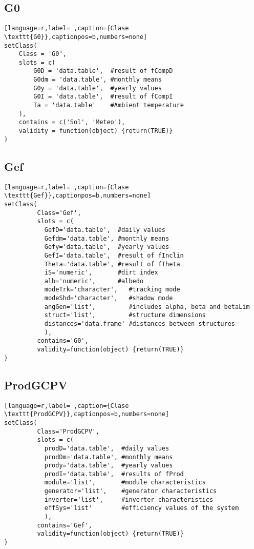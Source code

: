 \subsection{G0}
\label{sec:org1dfc051}
\label{subsec:g0}
\begin{lstlisting}[language=r,label= ,caption={Clase \texttt{G0}},captionpos=b,numbers=none]
setClass(
    Class = 'G0',
    slots = c(
        G0D = 'data.table',  #result of fCompD
        G0dm = 'data.table', #monthly means
        G0y = 'data.table',  #yearly values
        G0I = 'data.table',  #result of fCompI
        Ta = 'data.table'    #Ambient temperature
    ),
    contains = c('Sol', 'Meteo'),
    validity = function(object) {return(TRUE)}
)

\end{lstlisting}
\subsection{Gef}
\label{sec:org3c185e6}
\label{subsec:gef}
\begin{lstlisting}[language=r,label= ,caption={Clase \texttt{Gef}},captionpos=b,numbers=none]
setClass(
         Class='Gef',
         slots = c(
           GefD='data.table',  #daily values
           Gefdm='data.table', #monthly means
           Gefy='data.table',  #yearly values
           GefI='data.table',  #result of fInclin
           Theta='data.table', #result of fTheta
           iS='numeric',       #dirt index
           alb='numeric',      #albedo
           modeTrk='character',   #tracking mode
           modeShd='character',   #shadow mode
           angGen='list',         #includes alpha, beta and betaLim
           struct='list',         #structure dimensions
           distances='data.frame' #distances between structures
           ),
         contains='G0',
         validity=function(object) {return(TRUE)}
)
\end{lstlisting}
\subsection{ProdGCPV}
\label{sec:orge814b7f}
\label{subsec:clase-prodgcpv}
\begin{lstlisting}[language=r,label= ,caption={Clase \texttt{ProdGCPV}},captionpos=b,numbers=none]
setClass(
         Class='ProdGCPV',
         slots = c(
           prodD='data.table',  #daily values
           prodDm='data.table', #monthly means
           prody='data.table',  #yearly values
           prodI='data.table',  #results of fProd
           module='list',       #module characteristics
           generator='list',    #generator characteristics
           inverter='list',     #inverter characteristics
           effSys='list'        #efficiency values of the system
           ),
         contains='Gef',
         validity=function(object) {return(TRUE)}
)
\end{lstlisting}
